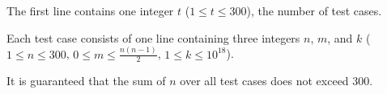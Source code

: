 The first line contains one integer $t$ ($1 \le t \le 300$), the number of test cases.

Each test case consists of one line containing three integers $n$, $m$, and $k$ ($1 \le n \le 300$, $0 \le m \le \frac{n(n-1)}{2}$, $1 \le k \le 10^{18}$).

It is guaranteed that the sum of $n$ over all test cases does not exceed $300$.
